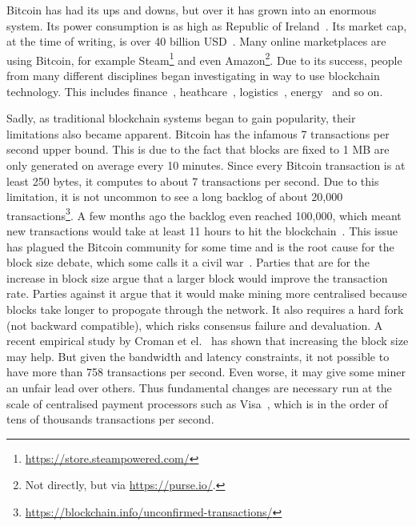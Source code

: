 Bitcoin has had its ups and downs, but over it has grown into an enormous system.
Its power consumption is as high as Republic of Ireland~\cite{o2014bitcoin}.
Its market cap, at the time of writing, is over 40 billion USD~\cite{bitcoinmarketcap}.
Many online marketplaces are using Bitcoin, for example Steam\footnote{\url{https://store.steampowered.com/}} and even Amazon\footnote{Not directly, but via \url{https://purse.io/}.}.
Due to its success, people from many different disciplines began investigating in way to use blockchain technology.
This includes finance~\cite{finance}, heathcare~\cite{healthcare}, logistics~\cite{supplychain}, energy~\cite{energy} and so on.

Sadly, as traditional blockchain systems began to gain popularity,
their limitations also became apparent.
Bitcoin has the infamous 7 transactions per second upper bound.
This is due to the fact that blocks are fixed to 1 MB are only generated on average every 10 minutes.
Since every Bitcoin transaction is at least 250 bytes, it computes to about 7 transactions per second.
Due to this limitation, it is not uncommon to see a long backlog of about 20,000 transactions\footnote{\url{https://blockchain.info/unconfirmed-transactions/}}.
A few months ago the backlog even reached 100,000, which meant new transactions would take at least 11 hours to hit the blockchain~\cite{bitcoinbacklog}.
This issue has plagued the Bitcoin community for some time and is the root cause for the block size debate, which some calls it a civil war~\cite{bitcoincivilwar}.
Parties that are for the increase in block size argue that a larger block would improve the transaction rate.
Parties against it argue that it would make mining more centralised because blocks take longer to propogate through the network.
It also requires a hard fork (not backward compatible), which risks consensus failure and devaluation.
A recent empirical study by Croman et el.~\cite{croman2016scaling} has shown that increasing the block size may help.
But given the bandwidth and latency constraints,
it not possible to have more than 758 transactions per second.
Even worse, it may give some miner an unfair lead over others.
Thus fundamental changes are necessary run at the scale of centralised payment processors such as Visa~\cite{visa},
which is in the order of tens of thousands transactions per second.

